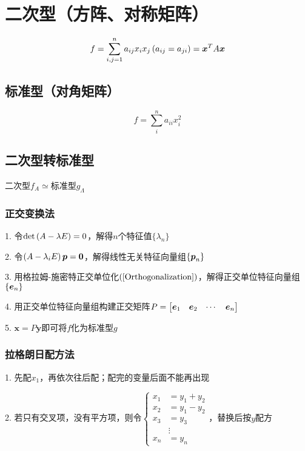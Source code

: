 \documentclass{article}
\begin{document}
\section{二次型（方阵、对称矩阵）}

\begin{definition}
    \[f=\sum_{i,j=1}^na_{ij}x_ix_j\left(a_{ij}=a_{ji}\right)
        =\boldsymbol x^TA\boldsymbol x\]
\end{definition}

\subsection{标准型（对角矩阵）}

\[f=\sum_i^na_{ii}x_i^2\]

\subsection{二次型转标准型}

二次型$f_A\simeq$标准型$g_\Lambda$

\subsubsection{正交变换法}

1. 令$\det\left(A-\lambda E\right)=0$，解得$n$个特征值$\{\lambda_n\}$

2. 令$\left(A-\lambda_iE\right)\boldsymbol p=\boldsymbol 0$，解得线性无关特征向量组$\{\boldsymbol p_n\}$

3. 用格拉姆-施密特正交单位化$\left(\ref{Orthogonalization}\right)$，解得正交单位特征向量组$\{\boldsymbol e_n\}$

4. 用正交单位特征向量组构建正交矩阵$P=\begin{bmatrix}\boldsymbol e_1&\boldsymbol e_2&\cdots&\boldsymbol e_n\end{bmatrix}$

5. $\boldsymbol x=P\boldsymbol y$即可将$f$化为标准型$g$

\subsubsection{拉格朗日配方法}

1. 先配$x_1$，再依次往后配；配完的变量后面不能再出现

2. 若只有交叉项，没有平方项，则令$\left\{\begin{aligned}
        x_1 & =y_1+y_2 \\
        x_2 & =y_1-y_2 \\
        x_3 & =y_3     \\
            & \vdots   \\
        x_n & =y_n
    \end{aligned}\right.$，替换后按$y$配方
\end{document}
